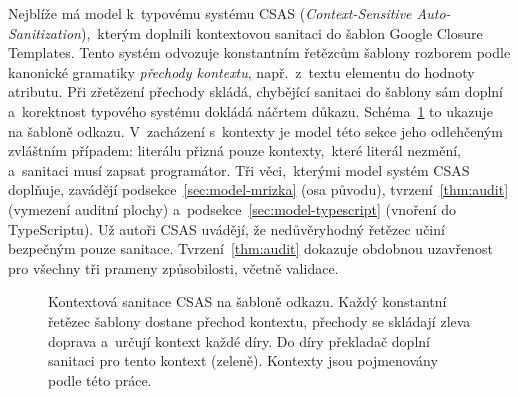 Nejblíže má model k~typovému systému CSAS (\emph{Context-Sensitive Auto-Sanitization}),~kterým \textcite{samuel2011context} doplnili kontextovou sanitaci do šablon Google Closure Templates. Tento systém odvozuje konstantním řetězcům šablony rozborem podle kanonické gramatiky \emph{přechody kontextu}, např.~z~textu elementu do hodnoty atributu. Při zřetězení přechody skládá, chybějící sanitaci do šablony sám doplní a~korektnost typového systému dokládá náčrtem důkazu. Schéma~\ref{fig:csas} to ukazuje na šabloně odkazu. V~zacházení s~kontexty je model této sekce jeho odlehčeným zvláštním případem: literálu přizná pouze kontexty,~které literál nezmění, a~sanitaci musí zapsat programátor. Tři věci,~kterými model systém CSAS doplňuje, zavádějí podsekce~\ref{sec:model-mrizka} (osa původu), tvrzení~\ref{thm:audit} (vymezení auditní plochy) a~podsekce~\ref{sec:model-typescript} (vnoření do TypeScriptu). Už autoři CSAS uvádějí, že nedůvěryhodný řetězec učiní bezpečným pouze sanitace. Tvrzení~\ref{thm:audit} dokazuje obdobnou uzavřenost pro všechny tři prameny způsobilosti, včetně validace.

\begin{figure}[htbp]
    \centering
    \caption[Kontextová sanitace CSAS na šabloně odkazu]{Kontextová sanitace CSAS na šabloně odkazu. Každý konstantní řetězec šablony dostane přechod kontextu, přechody se skládají zleva doprava a~určují kontext každé díry. Do díry překladač doplní sanitaci pro tento kontext (zeleně). Kontexty jsou pojmenovány podle této práce.}
    \label{fig:csas}
\end{figure}

